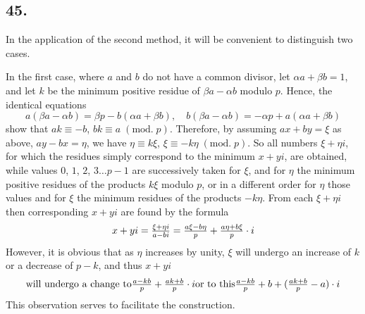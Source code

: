 \documentclass[twoside,12pt, showframe]{memoir}
\renewcommand{\pmod}[1]{\;(\textrm{mod.}\;#1)}
\let\oldfrac\frac
\def\frac#1#2{\mathchoice{\tfrac{#1}{#2}}{\oldfrac{#1}{#2}}{\genfrac{}{}{}{2}{#1}{#2\mathstrut}}{\genfrac{}{}{}{3}{#1}{#2\mathstrut}}}
\begin{document}
\subsection*{45.}
In the application of the second method, it will be convenient to distinguish two cases.

In the first case, where \(a\) and \(b\) do not have a common divisor, let \(\alpha a+\beta b=1\), and let \(k\) be the minimum positive residue of \(\beta a-\alpha b\) modulo \(p\). Hence, the identical equations
\[a(\beta a-\alpha b)=\beta p-b(\alpha a+\beta b), \quad b(\beta a-\alpha b)=-\alpha p+a(\alpha a+\beta b)\]
show that \(a k \equiv-b\), \(b k \equiv a \pmod{p}\). Therefore, by assuming \(a x+b y=\xi\) as above, \(a y-b x=\eta\), we have \(\eta \equiv k \xi\), \(\xi \equiv -k \eta \pmod{p}\). So all numbers \(\xi+\eta i\), for which the residues simply correspond to the minimum \(x+y i\), are obtained, while values \(0\), \(1\), \(2\), \(3 \ldots p-1\) are successively taken for \(\xi\), and for \(\eta\) the minimum positive residues of the products \(k \xi\) modulo \(p\), or in a different order for \(\eta\) those values and for \(\xi\) the minimum residues of the products \(-k \eta\). From each \(\xi+\eta i\) then corresponding \(x+y i\) are found by the formula
\[x+y i=\frac{\xi+\eta i}{a-b i}=\frac{a \xi-b \eta}{p}+\frac{a \eta+b \xi}{p} \cdot i\]
However, it is obvious that as \(\eta\) increases by unity, \(\xi\) will undergo an increase of \(k\) or a decrease of \(p-k\), and thus \(x+y i\)
\[ \text{will undergo a change to} \frac{a-k b}{p}+\frac{a k+b}{p} \cdot i \text{or to this} \frac{a-k b}{p}+b+(\frac{a k+b}{p}-a) \cdot i \]
This observation serves to facilitate the construction.
%
\end{document}
